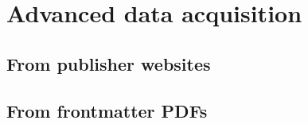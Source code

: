 \documentclass{ou-report}
\begin{document}







\section{Advanced data acquisition}
\subsection{From publisher websites}
\subsection{From frontmatter PDFs}
\end{document}
